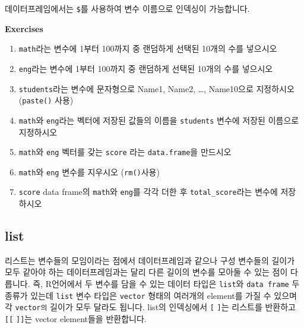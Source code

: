 \documentclass[
  a4paper,
]{book}
\newenvironment{Shaded}{\begin{snugshade}}{\end{snugshade}}
\newcommand{\DecValTok}[1]{\textcolor[rgb]{0.68,0.00,0.00}{#1}}
\newcommand{\DocumentationTok}[1]{\textcolor[rgb]{0.37,0.37,0.37}{\textit{#1}}}
\newcommand{\NormalTok}[1]{\textcolor[rgb]{0.00,0.23,0.31}{#1}}
\newcommand{\SpecialCharTok}[1]{\textcolor[rgb]{0.37,0.37,0.37}{#1}}
\newcommand{\StringTok}[1]{\textcolor[rgb]{0.13,0.47,0.30}{#1}}
\begin{document}
데이터프레임에서는 \texttt{\$}를 사용하여 변수 이름으로 인덱싱이
가능합니다.

\begin{Shaded}
\end{Shaded}

\textbf{Exercises}

\begin{enumerate}
\def\labelenumi{\arabic{enumi})}
\item
  \texttt{math}라는 변수에 1부터 100까지 중 랜덤하게 선택된 10개의 수를
  넣으시오
\item
  \texttt{eng}라는 변수에 1부터 100까지 중 랜덤하게 선택된 10개의 수를
  넣으시오
\item
  \texttt{students}라는 변수에 문자형으로 Name1, Name2, \ldots,
  Name10으로 지정하시오 (\texttt{paste()} 사용)
\item
  \texttt{math}와 \texttt{eng}라는 벡터에 저장된 값들의 이름을
  \texttt{students} 변수에 저장된 이름으로 지정하시오
\item
  \texttt{math}와 \texttt{eng} 벡터를 갖는 \texttt{score} 라는
  \texttt{data.frame}을 만드시오
\item
  \texttt{math}와 \texttt{eng} 변수를 지우시오 (\texttt{rm()}사용)
\item
  \texttt{score} data frame의 \texttt{math}와 \texttt{eng}를 각각 더한
  후 \texttt{total\_score}라는 변수에 저장 하시오
\end{enumerate}

\hypertarget{list}{%
\subsection{list}\label{list}}

리스트는 변수들의 모임이라는 점에서 데이터프레임과 같으나 구성 변수들의
길이가 모두 같아야 하는 데이터프레임과는 달리 다른 길이의 변수를 모아둘
수 있는 점이 다릅니다. 즉, R언어에서 두 변수를 담을 수 있는 데이터
타입은 \texttt{list}와 \texttt{data\ frame} 두 종류가 있는데
\texttt{list} 변수 타입은 \texttt{vector} 형태의 여러개의 element를 가질
수 있으며 각 \texttt{vector의} 길이가 모두 달라도 됩니다. list의
인덱싱에서 \texttt{{[}} \texttt{{]}}는 리스트를 반환하고 \texttt{{[}{[}}
\texttt{{]}{]}}는 vector element들을 반환합니다.
\end{document}
